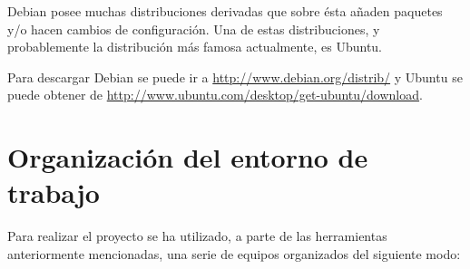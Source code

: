 Debian posee muchas distribuciones derivadas que sobre ésta añaden paquetes y/o hacen cambios de configuración. Una de estas distribuciones, y probablemente la distribución más famosa actualmente, es Ubuntu.

Para descargar Debian se puede ir a \url{http://www.debian.org/distrib/} y Ubuntu se puede obtener de \url{http://www.ubuntu.com/desktop/get-ubuntu/download}.






\section{Organización del entorno de trabajo}

Para realizar el proyecto se ha utilizado, a parte de las herramientas anteriormente mencionadas, una serie de equipos organizados del siguiente modo:

